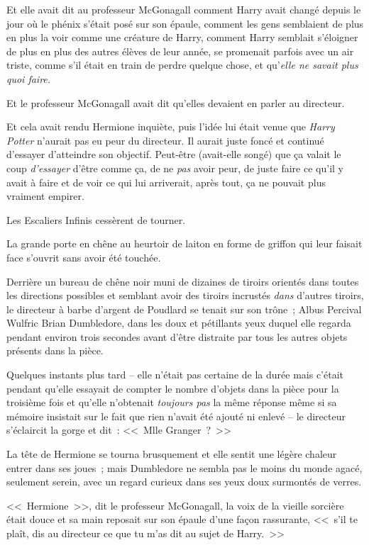 Et elle avait dit au professeur McGonagall comment Harry avait changé depuis le jour où le phénix s'était posé sur son épaule, comment les gens semblaient de plus en plus la voir comme une créature de Harry, comment Harry semblait s'éloigner de plus en plus des autres élèves de leur année, se promenait parfois avec un air triste, comme s'il était en train de perdre quelque chose, et qu'\emph{elle ne savait plus quoi faire.}

Et le professeur McGonagall avait dit qu'elles devaient en parler au directeur.

Et cela avait rendu Hermione inquiète, puis l'idée lui était venue que \emph{Harry Potter} n'aurait pas eu peur du directeur. Il aurait juste foncé et continué d'essayer d'atteindre son objectif. Peut-être (avait-elle songé) que ça valait le coup \emph{d'essayer} d'être comme ça, de ne \emph{pas} avoir peur, de juste faire ce qu'il y avait à faire et de voir ce qui lui arriverait, après tout, ça ne pouvait plus vraiment empirer.

Les Escaliers Infinis cessèrent de tourner.

La grande porte en chêne au heurtoir de laiton en forme de griffon qui leur faisait face s'ouvrit sans avoir été touchée.

Derrière un bureau de chêne noir muni de dizaines de tiroirs orientés dans toutes les directions possibles et semblant avoir des tiroirs incrustés \emph{dans} d'autres tiroirs, le directeur à barbe d'argent de Poudlard se tenait sur son trône~; Albus Percival Wulfric Brian Dumbledore, dans les doux et pétillants yeux duquel elle regarda pendant environ trois secondes avant d'être distraite par tous les autres objets présents dans la pièce.

Quelques instants plus tard -- elle n'était pas certaine de la durée mais c'était pendant qu'elle essayait de compter le nombre d'objets dans la pièce pour la troisième fois et qu'elle n'obtenait \emph{toujours pas} la même réponse même si sa mémoire insistait sur le fait que rien n'avait été ajouté ni enlevé -- le directeur s'éclaircit la gorge et dit~: <<~Mlle Granger~?~>>

La tête de Hermione se tourna brusquement et elle sentit une légère chaleur entrer dans ses joues~; mais Dumbledore ne sembla pas le moins du monde agacé, seulement serein, avec un regard curieux dans ses yeux doux surmontés de verres.

<<~Hermione~>>, dit le professeur McGonagall, la voix de la vieille sorcière était douce et sa main reposait sur son épaule d'une façon rassurante, <<~s'il te plaît, dis au directeur ce que tu m'as dit au sujet de Harry.~>>

